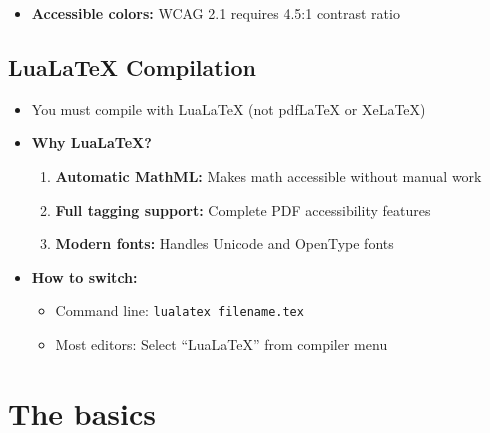 \documentclass{article}
\newcommand\RedText[1]{\textcolor{AccessibleRed}{#1}}
\begin{document}
\bigskip

\begin{itemize}
\item \textbf{Accessible colors:} WCAG 2.1 requires 4.5:1 contrast ratio
\end{itemize}

\bigskip

\noindent {}

\bigskip


\subsection{LuaLaTeX Compilation}

\begin{itemize}
\item You \RedText{must} compile with LuaLaTeX (not pdfLaTeX or XeLaTeX)

\bigskip

\item \textbf{Why LuaLaTeX?}
  \begin{enumerate}
  \item \textbf{Automatic MathML:} Makes math accessible without manual work
  \item \textbf{Full tagging support:} Complete PDF accessibility features
  \item \textbf{Modern fonts:} Handles Unicode and OpenType fonts
  \end{enumerate}

\bigskip

\item \textbf{How to switch:}
  \begin{itemize}
  \item Command line: \texttt{lualatex filename.tex}
  \item Most editors: Select ``LuaLaTeX'' from compiler menu
  \end{itemize}
\end{itemize}

\section{The basics}
\end{document}
